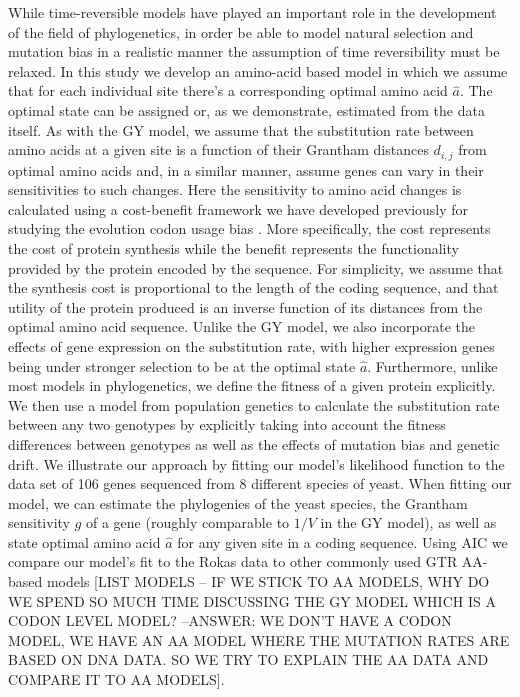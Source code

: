\documentclass[13pt]{article}
\begin{document}
While time-reversible models have played an important role in the development of the field of phylogenetics,  in order be able to model natural selection and mutation bias in a realistic manner the assumption of time reversibility must be relaxed.
In this study we develop an amino-acid based model in which we assume that for each individual site there's a corresponding optimal amino acid $\hat{a}$.
The optimal state can be assigned or, as we demonstrate, estimated from the data itself.
As with the GY model, we assume that the substitution rate between amino acids at a given site is a function of their Grantham distances $d_{i,j}$ from optimal amino acids and, in a similar manner, assume genes can vary in their sensitivities to such changes.
Here the sensitivity to amino acid changes is calculated using a cost-benefit framework we have developed previously for studying the evolution codon usage bias \cite{Gilchrist07, GilchristEtAl09,ShahAndGilchrist11}.
More specifically, the cost represents the cost of protein synthesis while the benefit represents the functionality provided by the protein encoded by the sequence.
For simplicity, we assume that the synthesis cost is proportional to the length of the coding sequence, and that utility of the protein produced is an inverse function of its distances from the optimal amino acid sequence.
Unlike the GY model, we also incorporate the effects of gene expression on the substitution rate, with higher expression genes being under stronger selection to be at the optimal state $\hat{a}$.
Furthermore, unlike most models in phylogenetics, we define the fitness of a given protein explicitly.
We then use a model from population genetics to calculate the substitution rate between any two genotypes by explicitly taking into account the fitness differences between genotypes as well as the effects of mutation bias and genetic drift.
We illustrate our approach by fitting our model's likelihood function to the \cite{RokasEtAl03} data set of 106 genes sequenced from 8 different species of yeast.
When fitting our model, we can estimate the phylogenies of the yeast species, the Grantham sensitivity $g$ of a gene (roughly comparable to $1/V$ in the GY model), as well as state optimal amino acid $\hat{a}$ for any given site in a coding sequence.
Using AIC we compare our model's fit to the Rokas data to other commonly used GTR AA-based models [LIST MODELS -- IF WE STICK TO AA MODELS, WHY DO WE SPEND SO MUCH TIME DISCUSSING THE GY MODEL WHICH IS A CODON LEVEL MODEL? --ANSWER: WE DON'T HAVE A CODON MODEL, WE HAVE AN AA MODEL WHERE THE MUTATION RATES ARE BASED ON DNA DATA. SO WE TRY TO EXPLAIN THE AA DATA AND COMPARE IT TO AA MODELS].
\end{document}
